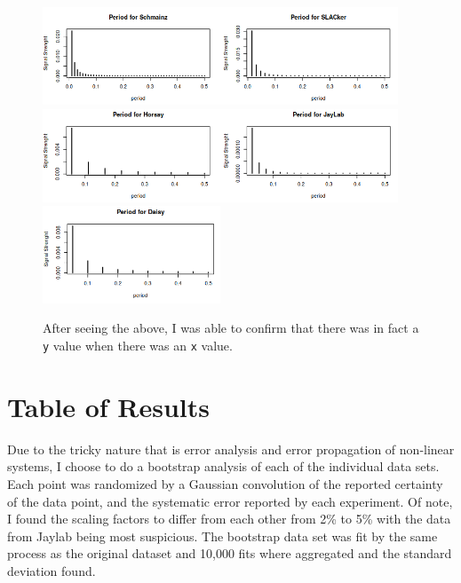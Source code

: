 \documentclass[12pt]{article}
\begin{document}
\begin{figure}[!htb]
  \centering
  \includegraphics[width=300pt]{period_data_a.png}
  \includegraphics[width=300pt]{period_data_b.png}
  \includegraphics[width=150pt]{period_data_c.png}
  \caption{After seeing the above, I was able to confirm that there was in fact a \texttt{y} value when there was an \texttt{x} value.}
\end{figure}

\pagebreak

\section{Table of Results}

Due to the tricky nature that is error analysis and error propagation of non-linear systems, I choose to do a bootstrap analysis of each of the individual data sets. Each point was randomized by a Gaussian convolution of the reported certainty of the data point, and the systematic error reported by each experiment. Of note, I found the scaling factors to differ from each other from 2\% to 5\% with the data from Jaylab being most suspicious. The bootstrap data set was fit by the same process as the original dataset and 10,000 fits where aggregated and the standard deviation found.
\end{document}
